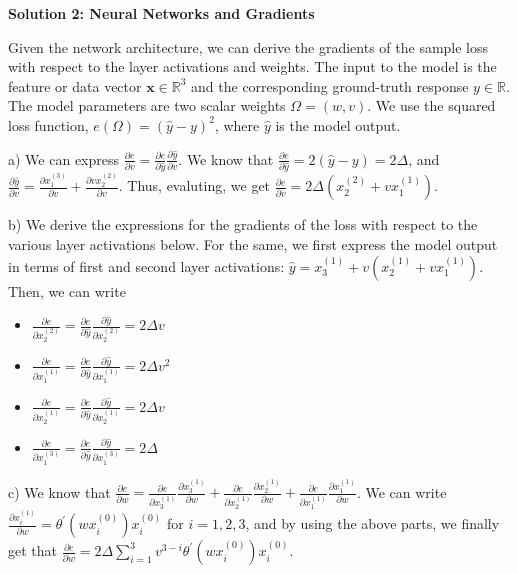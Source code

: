 \documentclass{article}
\newcommand{\R}{\mathbb{R}}
\renewcommand{\vec}[1]{\mathbf{#1}}
\begin{document}
    \vspace{0.5cm}

    \textbf{Solution 2: Neural Networks and Gradients}

    Given the network architecture, we can derive the gradients of the sample 
    loss with respect to the layer activations and weights. The input to the 
    model is the feature or data vector $\vec{x}\in\R^3$ and the
    corresponding ground-truth response $y\in\R$. The model parameters are 
    two scalar weights $\Omega = (w, v)$. We use the squared loss function, 
    $e(\Omega) = (\hat{y}-y)^2$, where $\hat{y}$ is the model output.

    a) We can express $\frac{\partial e}{\partial v} = \frac{\partial e}
    {\partial \hat{y}}\frac{\partial \hat{y}}{\partial v}$. We know that
    $\frac{\partial e}{\partial \hat{y}} = 2(\hat{y}-y) = 2\Delta$, and
    $\frac{\partial \hat{y}}{\partial v} = \frac{\partial x^{(3)}_1}{\partial 
    v}+\frac{\partial vx^{(2)}_2}{\partial v}$. Thus, evaluting, we get $\frac
    {\partial e}{\partial v} = 2\Delta\left(x^{(2)}_2 + vx^{(1)}_1\right)$.

    b) We derive the expressions for the gradients of the loss with respect to
    the various layer activations below. For the same, we first express the 
    model output in terms of first and second layer activations: $\hat{y} = 
    x^{(1)}_3 + v\left(x^{(1)}_2 + vx^{(1)}_1\right)$. Then, we can write
    \begin{itemize}
        \item $\frac{\partial e}{\partial x^{(2)}_2} = \frac{\partial e}
        {\partial \hat{y}}\frac{\partial \hat{y}}{\partial x^{(2)}_2} = 
        2\Delta v$
        \item $\frac{\partial e}{\partial x^{(1)}_1} = \frac{\partial e}
        {\partial \hat{y}}\frac{\partial \hat{y}}{\partial x^{(1)}_1} = 
        2\Delta v^2$
        \item $\frac{\partial e}{\partial x^{(1)}_2} = \frac{\partial e}
        {\partial \hat{y}}\frac{{\partial \hat{y}}}{\partial x^{(1)}_2} = 
        2\Delta v$
        \item $\frac{\partial e}{\partial x^{(3)}_1} = \frac{\partial e}
        {\partial \hat{y}}\frac{\partial \hat{y}}{\partial x^{(3)}_1} = 
        2\Delta$
    \end{itemize}

    c) We know that $\frac{\partial e}{\partial w} = \frac{\partial e}
    {\partial x^{(1)}_3}\frac{\partial x^{(1)}_3}{\partial w} + \frac
    {\partial e}{\partial x^{(1)}_2}\frac{\partial x^{(1)}_2}{\partial w} + 
    \frac{\partial e}{\partial x^{(1)}_1}\frac{\partial x^{(1)}_1}{\partial w}
    $. We can write $\frac{\partial x_i^{(1)}}{\partial w} = \theta^\prime(wx^
    {(0)}_i)x^{(0)}_i$ for $i = 1,2,3$, and by using the above parts, we 
    finally get that $\frac{\partial e}{\partial w} = 2\Delta\sum_{i=1}^3v^
    {3-i}\theta^\prime(wx^{(0)}_i)x^{(0)}_i$.
\end{document}
